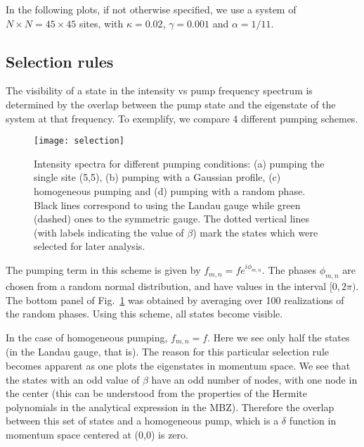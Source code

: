 \documentclass[twocolumn, 10pt, aps, superscriptaddress, floatfix, showpacs, prb, citeautoscript]{revtex4-1}
\newcommand{\co}[2]{#2}
\renewcommand{\paragraph}{\co}
\begin{document}
In the following plots, if not otherwise specified, we use a system of $N \times N = 45 \times 45$ sites, with $\kappa =
0.02$, $\gamma = 0.001$ and $\alpha = 1/11$.

\subsection{Selection rules}
\label{sec:selection}

The visibility of a state in the intensity vs pump frequency spectrum
is determined by the overlap between the pump state and the eigenstate
of the system at that frequency.  To exemplify, we compare 4 different
pumping schemes.

\begin{figure}[htb]\centering
  \texttt{[image: selection]}
  \caption{Intensity spectra for different pumping conditions: (a)
    pumping the single site (5,5), (b) pumping with a Gaussian
    profile, (c) homogeneous pumping and (d) pumping with a random
    phase. Black lines correspond to using the Landau gauge while
    green (dashed) ones to the symmetric gauge. The dotted vertical
    lines (with labels indicating the value of $\beta$)
    mark the states which were selected for later analysis.}
  \label{fig:pumping_schemes}
\end{figure}



\paragraph{Random phase}
The pumping term in this scheme is given by
$f_{m,n}=fe^{i\phi_{m,n}}$. The phases $\phi_{m,n}$ are chosen from a
random normal distribution, and have values in the interval
$[0,2\pi)$. The bottom panel of Fig.~\ref{fig:pumping_schemes} was
obtained by averaging over 100 realizations of the random phases.
Using this scheme, all states become visible.

\paragraph{Homogeneous pumping}
In the case of homogeneous pumping, $f_{m,n} = f$. Here we see only
half the states (in the Landau gauge, that is). The reason for this
particular selection rule becomes apparent as one plots the
eigenstates in momentum space. We see that the states with an odd
value of $\beta$ have an odd number of nodes, with one node in the
center (this can be understood from the properties of the Hermite
polynomials in the analytical expression in the MBZ). Therefore the
overlap between this set of states and a homogeneous pump, which is a
$\delta$ function in momentum space centered at (0,0) is zero.
\end{document}
